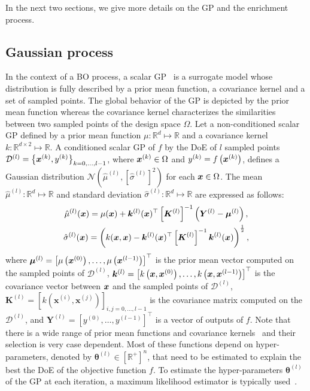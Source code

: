 In the next two sections, we give more details on the GP and the enrichment process.

\subsection{Gaussian process}
\label{ssec:GP}
In the context of a BO process, a scalar GP~\cite{RasmussenGaussianprocessesmachine2006, Krigestatisticalapproachbasic1951} is a surrogate model whose distribution is fully described by a prior mean function, a covariance kernel and a set of sampled points.
The global behavior of the GP is depicted by the prior mean function whereas the covariance kernel characterizes the similarities between two sampled points of the design space $\Omega$.
Let a non-conditioned scalar GP defined by a prior mean function $\mu: \mathbb{R}^d \mapsto \mathbb{R}$ and a covariance kernel $k: \mathbb{R}^{d \times 2} \mapsto \mathbb{R}$.
A conditioned scalar GP of $f$ by the DoE of $l$ sampled points $\mathcal{D}^{(l)} = \left\{ \bm{x}^{(k)}, y^{(k)} \right\}_{k=0,\ldots,l-1}$, where  $\bm{x}^{(k)} \in \Omega$ and $y^{(k)} = f\left(\bm{x}^{(k)}\right)$, defines a Gaussian distribution  $\mathcal{N} \left( \hat\mu^{(l)}, \left[\hat\sigma^{(l)}\right]^2 \right)$ for each $\bm{x} \in \Omega$.
The mean $\hat\mu^{(l)} : \mathbb{R}^d \mapsto \mathbb{R}$ and standard deviation $\hat\sigma^{(l)} : \mathbb{R}^d \mapsto \mathbb{R}$ are expressed as follows:
\begin{gather}
    \label{eq:mmu}
    \hat\mu^{(l)}(\bm{x}) =  \mu(\bm{x}) + \bm{k}^{(l)}(\bm{x})^\top \left[{\bm{K}^{(l)}}\right]^{-1} \left(\bm{Y}^{(l)} - \bm{\mu}^{(l)}\right), \\
    \label{eq:sigma}
    \hat\sigma^{(l)}(\bm{x}) = \left( k(\bm{x},\bm{x}) - \bm{k}^{(l)}(\bm{x})^\top \left[{\bm{K}^{(l)}}\right]^{-1} \bm{k}^{(l)}(\bm{x}) \right)^{\frac{1}{2}},
\end{gather}
where $\bm{\mu}^{(l)} = \left[\mu\left(\bm{x}^{(0)}\right), \ldots, \mu\left(\bm{x}^{(l-1)}\right) \right]^\top$ is the prior mean vector computed on the sampled points of $\mathcal{D}^{(l)}$,  \mbox{$\bm{k}^{(l)} = \left[k\left(\bm{x}, \bm{x}^{(0)}\right), \ldots, k\left( \bm{x}, \bm{x}^{(l-1)}\right) \right]^\top$} is the covariance vector between $\bm{x}$ and the sampled points of $\mathcal{D}^{(l)}$, \linebreak $\bm{K}^{(l)} = \left[k\left(\bm{x}^{(i)},\bm{x}^{(j)}\right)\right]_{i,j=0, \ldots, l-1}$ is the covariance matrix computed on the  $\mathcal{D}^{(l)}$, and $\bm{Y}^{(l)}= \left[y^{(0)}, \ldots, y^{(l-1)}\right]^\top$
is a vector of outputs of $f$.
Note that there is a wide range of prior mean functions and covariance kernels~\cite{duvenaudStructureDiscoveryNonparametric2013} and their selection is very case dependent.
Most of these functions depend on hyper-parameters, denoted by $\bm{\theta}^{(l)} \in \left[\mathbb{R}^+\right]^n$, that need to be estimated to explain the best the DoE of the objective function $f$.
To estimate the hyper-parameters $\bm{\theta}^{(l)}$ of the GP at each iteration, a maximum likelihood estimator is typically used~\cite{gelmanBayesianDataAnalysis2014}.

